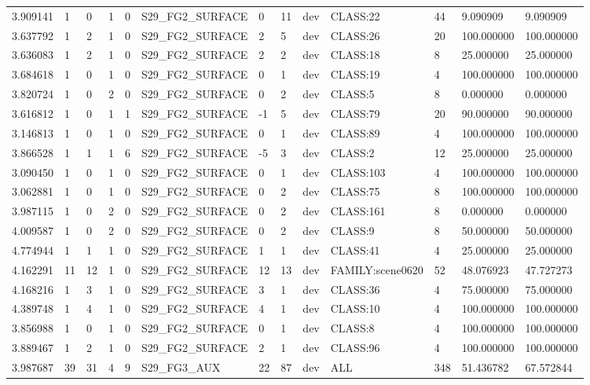 \begin{tabular}{lllllllllllll}
3.909141 & 1 & 0 & 1 & 0 & S29\_FG2\_SURFACE & 0 & 11 & dev & CLASS:22 & 44 & 9.090909 & 9.090909 \\
3.637792 & 1 & 2 & 1 & 0 & S29\_FG2\_SURFACE & 2 & 5 & dev & CLASS:26 & 20 & 100.000000 & 100.000000 \\
3.636083 & 1 & 2 & 1 & 0 & S29\_FG2\_SURFACE & 2 & 2 & dev & CLASS:18 & 8 & 25.000000 & 25.000000 \\
3.684618 & 1 & 0 & 1 & 0 & S29\_FG2\_SURFACE & 0 & 1 & dev & CLASS:19 & 4 & 100.000000 & 100.000000 \\
3.820724 & 1 & 0 & 2 & 0 & S29\_FG2\_SURFACE & 0 & 2 & dev & CLASS:5 & 8 & 0.000000 & 0.000000 \\
3.616812 & 1 & 0 & 1 & 1 & S29\_FG2\_SURFACE & -1 & 5 & dev & CLASS:79 & 20 & 90.000000 & 90.000000 \\
3.146813 & 1 & 0 & 1 & 0 & S29\_FG2\_SURFACE & 0 & 1 & dev & CLASS:89 & 4 & 100.000000 & 100.000000 \\
3.866528 & 1 & 1 & 1 & 6 & S29\_FG2\_SURFACE & -5 & 3 & dev & CLASS:2 & 12 & 25.000000 & 25.000000 \\
3.090450 & 1 & 0 & 1 & 0 & S29\_FG2\_SURFACE & 0 & 1 & dev & CLASS:103 & 4 & 100.000000 & 100.000000 \\
3.062881 & 1 & 0 & 1 & 0 & S29\_FG2\_SURFACE & 0 & 2 & dev & CLASS:75 & 8 & 100.000000 & 100.000000 \\
3.987115 & 1 & 0 & 2 & 0 & S29\_FG2\_SURFACE & 0 & 2 & dev & CLASS:161 & 8 & 0.000000 & 0.000000 \\
4.009587 & 1 & 0 & 2 & 0 & S29\_FG2\_SURFACE & 0 & 2 & dev & CLASS:9 & 8 & 50.000000 & 50.000000 \\
4.774944 & 1 & 1 & 1 & 0 & S29\_FG2\_SURFACE & 1 & 1 & dev & CLASS:41 & 4 & 25.000000 & 25.000000 \\
4.162291 & 11 & 12 & 1 & 0 & S29\_FG2\_SURFACE & 12 & 13 & dev & FAMILY:scene0620 & 52 & 48.076923 & 47.727273 \\
4.168216 & 1 & 3 & 1 & 0 & S29\_FG2\_SURFACE & 3 & 1 & dev & CLASS:36 & 4 & 75.000000 & 75.000000 \\
4.389748 & 1 & 4 & 1 & 0 & S29\_FG2\_SURFACE & 4 & 1 & dev & CLASS:10 & 4 & 100.000000 & 100.000000 \\
3.856988 & 1 & 0 & 1 & 0 & S29\_FG2\_SURFACE & 0 & 1 & dev & CLASS:8 & 4 & 100.000000 & 100.000000 \\
3.889467 & 1 & 2 & 1 & 0 & S29\_FG2\_SURFACE & 2 & 1 & dev & CLASS:96 & 4 & 100.000000 & 100.000000 \\
3.987687 & 39 & 31 & 4 & 9 & S29\_FG3\_AUX & 22 & 87 & dev & ALL & 348 & 51.436782 & 67.572844 \\

\end{tabular}
